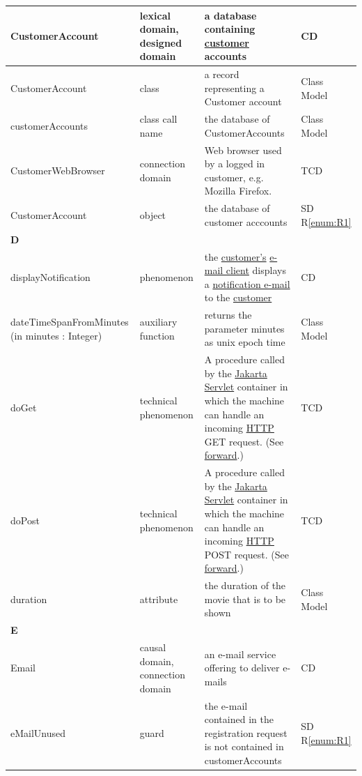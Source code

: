 \documentclass[a4paper,10pt,titlepage,bibtotoc,bibtotocnumbered]{scrreprt}
\begin{document}
\begin{longtable}{|p{4.75cm}|p{3cm}|p{5cm}|l|}
\hline
\hypertarget{glossary:CustomerAccount}{CustomerAccount} & lexical domain, designed domain & a database containing \hyperlink{glossary:Customer}{customer} accounts & CD\\
\hline
CustomerAccount & class & a record representing a Customer account & Class Model\\
\hline
customerAccounts & class call name & the database of CustomerAccounts & Class Model\\
\hline
CustomerWebBrowser & connection domain & Web browser used by a logged in customer, e.g. Mozilla Firefox. & TCD\\
\hline
CustomerAccount & object & the database of customer acccounts & SD R\ref{enum:R1}\\
\hline
\multicolumn{4}{|l|}{\textbf{D}}\\
\hline
\hypertarget{glossary:displayNotification}{displayNotification} & phenomenon & the \hyperlink{glossary:Customer}{customer's} \hyperlink{glossary:Email}{e-mail client} displays a \hyperlink{glossary:notifyCustomer}{notification e-mail} to the \hyperlink{glossary:Customer}{customer} & CD\\
\hline
dateTimeSpanFromMinutes (in minutes : Integer) & auxiliary function & returns the parameter minutes as unix epoch time & Class Model\\
\hline
doGet & technical phenomenon & A procedure called by the \href{https://jakarta.ee/specifications/servlet/}{Jakarta Servlet} container in which the machine can handle an incoming \href{https://datatracker.ietf.org/doc/html/rfc9112}{HTTP} GET request. (See \hyperlink{glossary:forward}{forward}.) & TCD\\
\hline
doPost & technical phenomenon & A procedure called by the \href{https://jakarta.ee/specifications/servlet/}{Jakarta Servlet} container in which the machine can handle an incoming \href{https://datatracker.ietf.org/doc/html/rfc9112}{HTTP} POST request. (See \hyperlink{glossary:forward}{forward}.) & TCD\\
\hline
duration & attribute & the duration of the movie that is to be shown & Class Model\\
\hline
\multicolumn{4}{|l|}{\textbf{E}}\\
\hline
\hypertarget{glossary:Email}{Email} & causal domain, connection domain & an e-mail service offering to deliver e-mails & CD\\
\hline
eMailUnused & guard & the e-mail contained in the registration request is not contained in customerAccounts & SD R\ref{enum:R1}\\

\end{longtable}
\end{document}
